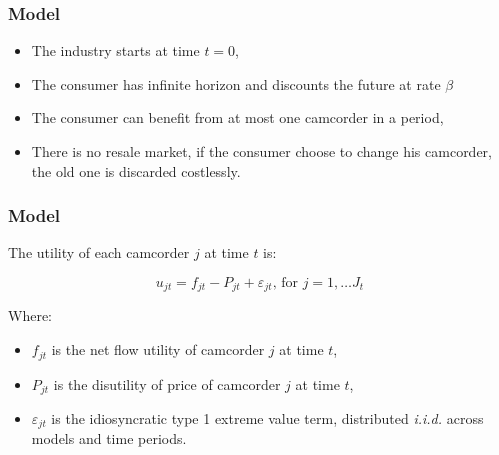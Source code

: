 \documentclass{beamer}
\theoremstyle{definition}
\begin{document}


\begin{frame}
  \frametitle{Model}
  
  \begin{itemize}
    \item The industry starts at time $t = 0$,
    \item The consumer has infinite horizon and discounts the future at rate
      $\beta$
    \item The consumer can benefit from at most one camcorder in a period,
    \item There is no resale market, if the consumer choose to change his
      camcorder, the old one is discarded costlessly.
  \end{itemize} 

\end{frame}

\begin{frame}
  \frametitle{Model}

  The utility of each camcorder $j$ at time $t$ is:

  \[ u_{jt} = f_{jt} - P_{jt} + \varepsilon_{jt}\text{, for }j = 1,\ldots J_t \]

  Where:

  \begin{itemize}
    \item $f_{jt}$ is the net flow utility of camcorder $j$ at time $t$,
    \item $P_{jt}$ is the disutility of price of camcorder $j$ at time $t$,
    \item $\varepsilon_{jt}$ is the idiosyncratic type 1 extreme value term,
      distributed \textit{i.i.d.} across models and time periods.
  \end{itemize}

\end{frame}
\end{document}
